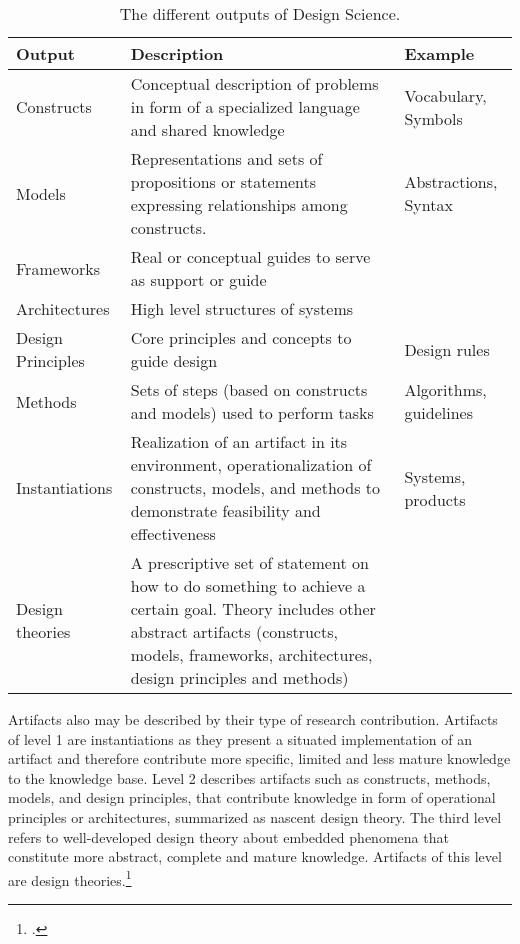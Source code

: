 \begin{table}
\setlength\extrarowheight{2pt} %
  \centering
  \begin{tabularx}{\textwidth}{|l|X|l|}
    \hline
        \textbf{Output} & \textbf{Description} & \textbf{Example}  \\ \hline\hline
        Constructs & Conceptual description of problems in form of a specialized language and shared knowledge & Vocabulary, Symbols \\
        Models & Representations and sets of propositions or statements expressing relationships among constructs. & Abstractions, Syntax \\
        Frameworks & Real or conceptual guides to serve as support or guide & \\
        Architectures & High level structures of systems & \\ 
        Design Principles & Core principles and concepts to guide design & Design rules \\
        Methods & Sets of steps (based on constructs and models) used to perform tasks & Algorithms, guidelines \\
        Instantiations & Realization of an artifact in its environment, operationalization of constructs, models, and methods to demonstrate feasibility and effectiveness & Systems, products \\
        Design theories & A prescriptive set of statement on how to do something to achieve a certain goal. Theory includes other abstract artifacts (constructs, models, frameworks, architectures, design principles and methods) & \\ \hline
    \end{tabularx}
    \caption[The different outputs of Design Science.]{The different outputs of Design Science.\footnotemark }
    \label{tab:Artifacts}
\end{table}

Artifacts also may be described by their type of research contribution. Artifacts of level 1 are instantiations as they present a situated implementation of an artifact and therefore contribute more specific, limited and less mature knowledge to the knowledge base. Level 2 describes artifacts such as constructs, methods, models, and design principles, that contribute knowledge in form of operational principles or architectures, summarized as nascent design theory. The third level refers to well-developed design theory about embedded phenomena that constitute more abstract, complete and mature knowledge. Artifacts of this level are design theories.\footcite[Cf.][p.340]{GregorPositioningpresentingdesign2013} \label{topic:levels}

